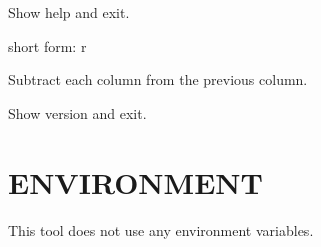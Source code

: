 \documentclass[letterpaper,10pt,english]{sphinxmanual}
\begin{document}
\begin{fulllineitems}
\label{\detokenize{mariadb-status-diff:cmdoption-mariadb-status-diff-help}}
Show help and exit.

\end{fulllineitems}


\begin{fulllineitems}
\label{\detokenize{mariadb-status-diff:cmdoption-mariadb-status-diff-relative}}
short form: \sphinxhyphen{}r

Subtract each column from the previous column.

\end{fulllineitems}


\begin{fulllineitems}
\label{\detokenize{mariadb-status-diff:cmdoption-mariadb-status-diff-version}}
Show version and exit.

\end{fulllineitems}



\section{ENVIRONMENT}
\label{\detokenize{mariadb-status-diff:environment}}
This tool does not use any environment variables.
\end{document}
